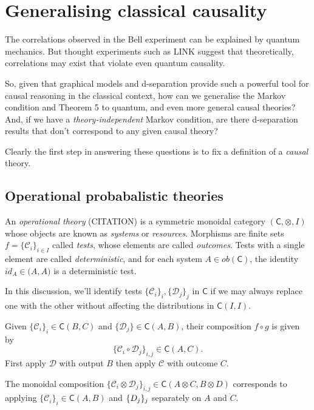 \documentclass[11pt, oneside]{article}   	%
\begin{document}
\section{Generalising classical causality}

The correlations observed in the Bell experiment can be explained by quantum mechanics. But thought experiments such as LINK suggest that theoretically, correlations may exist that violate even quantum causality.


So, given that graphical models and d-separation provide such a powerful tool for causal reasoning in the classical context, 
how can we generalise the Markov condition and Theorem 5 to quantum, and even more general causal theories? And, if we have a \emph{theory-independent} Markov condition, are there d-separation results that don't correspond to any given causal theory? 

Clearly the first step in answering these questions is to fix a definition of a \emph{causal} theory.

\subsection{Operational probabalistic theories}

An \emph{operational theory} (CITATION) is a symmetric monoidal category $(\mathsf C, \otimes, I)$ 
whose objects are known as \emph{systems} or \emph{resources}. Morphisms are finite sets $f = \{\mathcal C_i\}_{i \in I}$ called \emph{tests}, whose elements are called \emph{outcomes}. Tests with a single element are called \emph{deterministic}, and for each system $A \in ob (\mathsf C)$, the identity $id_A \in \mathsf (A,A)$ is a deterministic test.

In this discussion, we'll identify tests $\{\mathcal C_i \}_i , \{\mathcal D_j\}_j$ in $\mathsf C$ if we may always replace one with the other without affecting the distributions in $\mathsf C(I, I)$.


Given $\{\mathcal C_i \}_i \in \mathsf C(B, C)$ and $\{\mathcal D_j \} \in \mathsf C(A, B)$, their composition $f \circ g$ is given by
\[ \{ \mathcal C_i \circ \mathcal D_j \}_{i,j} \in \mathsf C(A, C).\]
First apply $\mathcal D$ with output $B$ then apply $\mathcal C$ with outcome $C$. 

The monoidal composition $\{ \mathcal C_i \otimes \mathcal D_j \}_{i, j} \in \mathsf C(A \otimes C, B \otimes D)$ corresponds to applying $\{\mathcal C_i\}_i \in \mathsf C(A,B)$ and $ \mathcal \{ D_j \}_j$ separately on $ A$ and $C$. 
 
\end{document}
